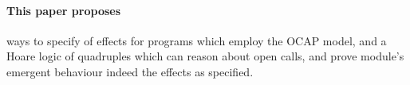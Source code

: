 
\paragraph{This paper proposes} %
 ways to specify  \taming of effects for  programs which employ the OCAP model, 
 and a Hoare logic of quadruples which can reason about open calls, and prove module's emergent behaviour indeed \tames the effects as specified.

